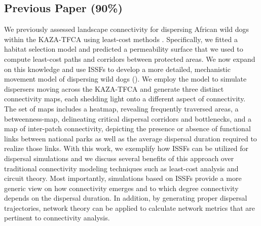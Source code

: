 \documentclass[abstract=on,10pt,a4paper,bibliography=totocnumbered]{article}
\begin{document}
\subsection{Previous Paper (90\%)}
We previously assessed landscape connectivity for dispersing African wild dogs
within the KAZA-TFCA using least-cost methods \citep{Hofmann.2021}.
Specifically, we fitted a habitat selection model and predicted a permeability
surface that we used to compute least-cost paths and corridors between protected
areas. We now expand on this knowledge and use ISSFs to develop a more detailed,
mechanistic movement model of dispersing wild dogs ().
We employ the model to simulate dispersers moving across the KAZA-TFCA and
generate three distinct connectivity maps, each shedding light onto a different
aspect of connectivity. The set of maps includes a heatmap, revealing frequently
traversed areas, a betweenness-map, delineating critical dispersal corridors and
bottlenecks, and a map of inter-patch connectivity, depicting the presence or
absence of functional links between national parks as well as the average
dispersal duration required to realize those links. With this work, we exemplify
how ISSFs can be utilized for dispersal simulations and we discuss several
benefits of this approach over traditional connectivity modeling techniques such
as least-cost analysis and circuit theory. Most importantly, simulations based
on ISSFs provide a more generic view on how connectivity emerges and to which
degree connectivity depends on the dispersal duration. In addition, by
generating proper dispersal trajectories, network theory can be applied to
calculate network metrics that are pertinent to connectivity analysis.
\end{document}
